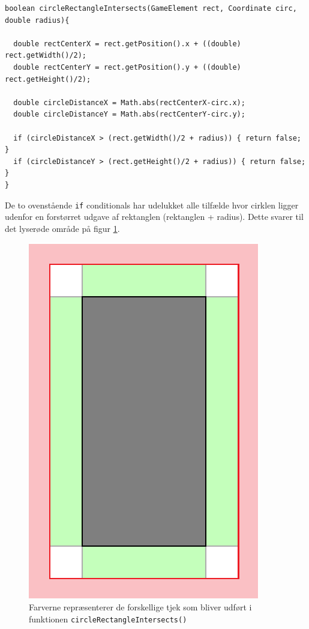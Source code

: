 \documentclass[titlepage,danish]{article}
\newcommand{\code}[1]{\texttt{#1}}
\begin{document}
\begin{verbatim}
boolean circleRectangleIntersects(GameElement rect, Coordinate circ, double radius){

  double rectCenterX = rect.getPosition().x + ((double) rect.getWidth()/2);
  double rectCenterY = rect.getPosition().y + ((double) rect.getHeight()/2);

  double circleDistanceX = Math.abs(rectCenterX-circ.x);
  double circleDistanceY = Math.abs(rectCenterY-circ.y);

  if (circleDistanceX > (rect.getWidth()/2 + radius)) { return false; }
  if (circleDistanceY > (rect.getHeight()/2 + radius)) { return false; }
}
\end{verbatim}

De to ovenstående \code{if} conditionals har udelukket alle tilfælde hvor cirklen ligger udenfor en
forstørret udgave af rektanglen (rektanglen + radius). Dette svarer til det lyserøde område på
figur \ref{fig:col_rect}.

\begin{figure}[h!]
  \centering
  \includegraphics[scale=0.60]{rekt_cirk_02.eps}
  \caption{Farverne repræsenterer de forskellige tjek som bliver udført i funktionen \code{circleRectangleIntersects()}}
  \label{fig:col_rect}
\end{figure}
\end{document}
